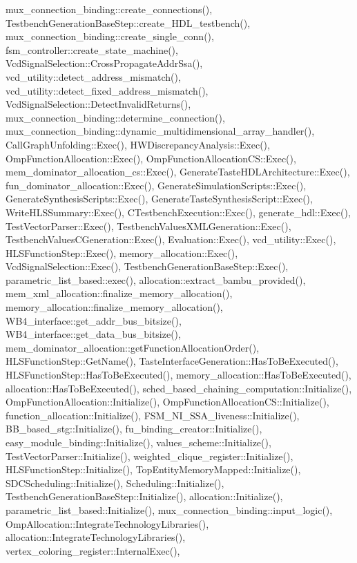 mux\+\_\+connection\+\_\+binding\+::create\+\_\+connections(), Testbench\+Generation\+Base\+Step\+::create\+\_\+\+H\+D\+L\+\_\+testbench(), mux\+\_\+connection\+\_\+binding\+::create\+\_\+single\+\_\+conn(), fsm\+\_\+controller\+::create\+\_\+state\+\_\+machine(), Vcd\+Signal\+Selection\+::\+Cross\+Propagate\+Addr\+Ssa(), vcd\+\_\+utility\+::detect\+\_\+address\+\_\+mismatch(), vcd\+\_\+utility\+::detect\+\_\+fixed\+\_\+address\+\_\+mismatch(), Vcd\+Signal\+Selection\+::\+Detect\+Invalid\+Returns(), mux\+\_\+connection\+\_\+binding\+::determine\+\_\+connection(), mux\+\_\+connection\+\_\+binding\+::dynamic\+\_\+multidimensional\+\_\+array\+\_\+handler(), Call\+Graph\+Unfolding\+::\+Exec(), H\+W\+Discrepancy\+Analysis\+::\+Exec(), Omp\+Function\+Allocation\+::\+Exec(), Omp\+Function\+Allocation\+C\+S\+::\+Exec(), mem\+\_\+dominator\+\_\+allocation\+\_\+cs\+::\+Exec(), Generate\+Taste\+H\+D\+L\+Architecture\+::\+Exec(), fun\+\_\+dominator\+\_\+allocation\+::\+Exec(), Generate\+Simulation\+Scripts\+::\+Exec(), Generate\+Synthesis\+Scripts\+::\+Exec(), Generate\+Taste\+Synthesis\+Script\+::\+Exec(), Write\+H\+L\+S\+Summary\+::\+Exec(), C\+Testbench\+Execution\+::\+Exec(), generate\+\_\+hdl\+::\+Exec(), Test\+Vector\+Parser\+::\+Exec(), Testbench\+Values\+X\+M\+L\+Generation\+::\+Exec(), Testbench\+Values\+C\+Generation\+::\+Exec(), Evaluation\+::\+Exec(), vcd\+\_\+utility\+::\+Exec(), H\+L\+S\+Function\+Step\+::\+Exec(), memory\+\_\+allocation\+::\+Exec(), Vcd\+Signal\+Selection\+::\+Exec(), Testbench\+Generation\+Base\+Step\+::\+Exec(), parametric\+\_\+list\+\_\+based\+::exec(), allocation\+::extract\+\_\+bambu\+\_\+provided(), mem\+\_\+xml\+\_\+allocation\+::finalize\+\_\+memory\+\_\+allocation(), memory\+\_\+allocation\+::finalize\+\_\+memory\+\_\+allocation(), W\+B4\+\_\+interface\+::get\+\_\+addr\+\_\+bus\+\_\+bitsize(), W\+B4\+\_\+interface\+::get\+\_\+data\+\_\+bus\+\_\+bitsize(), mem\+\_\+dominator\+\_\+allocation\+::get\+Function\+Allocation\+Order(), H\+L\+S\+Function\+Step\+::\+Get\+Name(), Taste\+Interface\+Generation\+::\+Has\+To\+Be\+Executed(), H\+L\+S\+Function\+Step\+::\+Has\+To\+Be\+Executed(), memory\+\_\+allocation\+::\+Has\+To\+Be\+Executed(), allocation\+::\+Has\+To\+Be\+Executed(), sched\+\_\+based\+\_\+chaining\+\_\+computation\+::\+Initialize(), Omp\+Function\+Allocation\+::\+Initialize(), Omp\+Function\+Allocation\+C\+S\+::\+Initialize(), function\+\_\+allocation\+::\+Initialize(), F\+S\+M\+\_\+\+N\+I\+\_\+\+S\+S\+A\+\_\+liveness\+::\+Initialize(), B\+B\+\_\+based\+\_\+stg\+::\+Initialize(), fu\+\_\+binding\+\_\+creator\+::\+Initialize(), easy\+\_\+module\+\_\+binding\+::\+Initialize(), values\+\_\+scheme\+::\+Initialize(), Test\+Vector\+Parser\+::\+Initialize(), weighted\+\_\+clique\+\_\+register\+::\+Initialize(), H\+L\+S\+Function\+Step\+::\+Initialize(), Top\+Entity\+Memory\+Mapped\+::\+Initialize(), S\+D\+C\+Scheduling\+::\+Initialize(), Scheduling\+::\+Initialize(), Testbench\+Generation\+Base\+Step\+::\+Initialize(), allocation\+::\+Initialize(), parametric\+\_\+list\+\_\+based\+::\+Initialize(), mux\+\_\+connection\+\_\+binding\+::input\+\_\+logic(), Omp\+Allocation\+::\+Integrate\+Technology\+Libraries(), allocation\+::\+Integrate\+Technology\+Libraries(), vertex\+\_\+coloring\+\_\+register\+::\+Internal\+Exec(), 